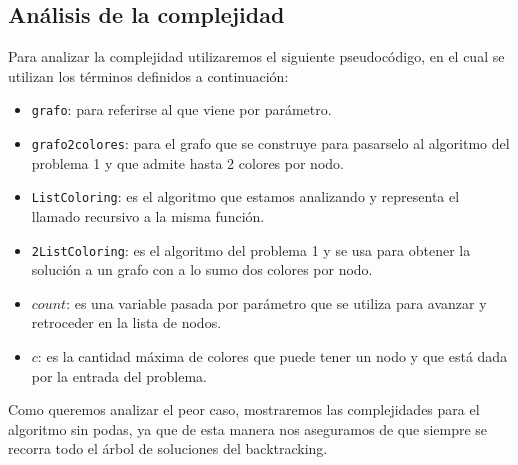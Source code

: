 \subsection{Análisis de la complejidad}
\label{sec:complj}

Para analizar la complejidad utilizaremos el siguiente pseudocódigo, en el cual se utilizan los términos definidos a continuación:
\begin{itemize}
	\item \texttt{grafo}: para referirse al que viene por parámetro.
	
	\item \texttt{grafo2colores}: para el grafo que se construye para pasarselo al algoritmo del problema 1 y que admite hasta 2 colores por nodo.
	
	\item \texttt{ListColoring}: es el algoritmo que estamos analizando y representa el llamado recursivo a la misma función. 
	
	\item \texttt{2ListColoring}: es el algoritmo del problema 1 y se usa para obtener la solución a un grafo con a lo sumo dos colores por nodo.
	
	\item $count$: es una variable pasada por parámetro que se utiliza para avanzar y retroceder en la lista de nodos.
	
	\item $c$: es la cantidad máxima de colores que puede tener un nodo y que está dada por la entrada del problema.
\end{itemize}

Como queremos analizar el peor caso, mostraremos las complejidades para el algoritmo sin podas, ya que de esta manera nos aseguramos de que siempre se recorra todo el árbol de soluciones del backtracking.
\newline

